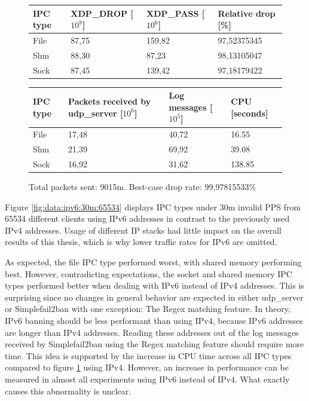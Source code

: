 \begin{figure}[!h]
	\centering
	\scriptsize
	\begin{tabular}{llll}
		\toprule
		\textbf{IPC type} & \textbf{XDP\_DROP [$10^8$]} & \textbf{XDP\_PASS [$10^6$]} & \textbf{Relative drop [\%]}\\ \midrule 
		File & 87,75 & 159,82 & 97,52375345 \\
        Shm & 88,30 & 87,23 & 98,13105047 \\
        Sock & 87,45 & 139,42 & 97,18179422 \\
	\bottomrule
	\end{tabular}
    \begin{tabular}{llll}
		\toprule
		\textbf{IPC type} & \textbf{Packets received by udp\_server [$10^6$]} & \textbf{Log messages [$10^5$]} & \textbf{CPU [seconds]} \\ \midrule 
		File & 17,48 & 40,72 & 16.55 \\
        Shm & 21,39 & 69,92 & 39.08 \\
        Sock & 16,92 & 31,62 & 138.85 \\
	\bottomrule
	\end{tabular}
	\caption[Simplefail2ban, IPv4, 30m \ac{PPS}, 65534 malicious clients]{Total packets sent: 9015m. Best-case drop rate: 99,97815533\%}
	\label{fig:data:ipv4:30m:65534}
\end{figure}

Figure \ref{fig:data:ipv6:30m:65534} displays \ac{IPC} types under 30m invalid \ac{PPS} from 65534 different clients using IPv6 addresses in contrast to the previously used IPv4 addresses.
Usage of different \ac{IP} stacks had little impact on the overall results of this thesis, which is why lower traffic rates for IPv6 are omitted.

As expected, the file \ac{IPC} type performed worst, with shared memory performing best.
However, contradicting expectations, the socket and shared memory \ac{IPC} types performed better when dealing with IPv6 instead of IPv4 addresses.
This is surprising since no changes in general behavior are expected in either udp\_server or Simplefail2ban with one exception: The \ac{Regex} matching feature.
In theory, IPv6 banning should be less performant than using IPv4, because IPv6 addresses are longer than IPv4 addresses.
Reading these addresses out of the log messages received by Simplefail2ban using the \ac{Regex} matching feature should require more time.
This idea is supported by the increase in \ac{CPU} time across all \ac{IPC} types compared to figure \ref{fig:data:ipv4:30m:65534} using IPv4.
However, an increase in performance can be measured in almost all experiments using IPv6 instead of IPv4.
What exactly causes this abnormality is unclear.


